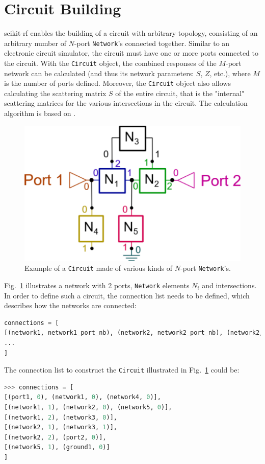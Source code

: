 \documentclass[10pt, letterpaper]{scrartcl}
\newcommand{\skrf}{{s}cikit-rf\xspace}
\begin{document}
\section{Circuit Building}
\skrf{} enables the building of a circuit with arbitrary topology, consisting of an arbitrary number of $N$-port \texttt{Network}'s connected together. Similar to an electronic circuit simulator, the circuit must have one or more ports connected to the circuit. With the \texttt{Circuit} object, the combined responses of the $M$-port network can be calculated (and thus its network parameters: $S$, $Z$, etc.), where $M$ is the number of ports defined. Moreover, the \texttt{Circuit} object also allows calculating the scattering matrix $S$ of the entire circuit, that is the "internal" scattering matrices for the various intersections in the circuit. The calculation algorithm is based on \cite{hallbjorner2003}.

\begin{figure}
	\centering
	\includegraphics[width=0.5\linewidth]{figures/circuit.png}
	\caption{ Example of a \texttt{Circuit} made of various kinds of $N$-port \texttt{Network}'s.}
	\label{fig:circuit}
\end{figure}

Fig.~\ref{fig:circuit} illustrates a network with 2 ports, \texttt{Network} elements $N_i$ and intersections. In order to define such a circuit, the connection list needs to be defined, which describes how the networks are connected:

\begin{lstlisting}[language=Python]
connections = [
[(network1, network1_port_nb), (network2, network2_port_nb), (network2, network2_port_nb), ...], 
...
]
\end{lstlisting}

The connection list to construct the \texttt{Circuit} illustrated in Fig.~\ref{fig:circuit} could be:

\begin{lstlisting}[language=Python]
>>> connections = [
[(port1, 0), (network1, 0), (network4, 0)],
[(network1, 1), (network2, 0), (network5, 0)],
[(network1, 2), (network3, 0)],
[(network2, 1), (network3, 1)],
[(network2, 2), (port2, 0)],
[(network5, 1), (ground1, 0)]
]
\end{lstlisting}
\end{document}
